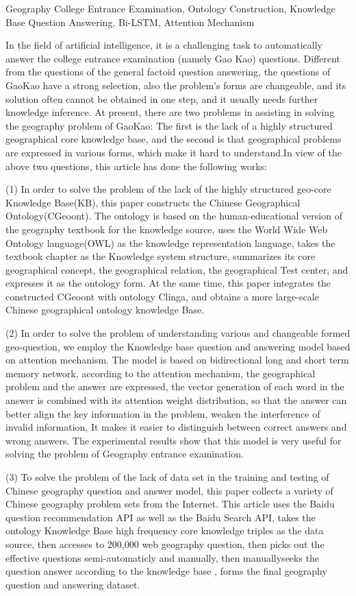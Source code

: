 \begin{englishabstract}{Geography College Entrance Examination, Ontology Construction, Knowledge Base Question Answering, Bi-LSTM, Attention Mechanism}

	In the field of artificial intelligence, it is a challenging task to automatically answer the college entrance examination (namely Gao Kao) questions. Different from the questions of the general factoid question answering, the questions of GaoKao have a strong selection, also the problem's forms are changeable, and its solution often cannot be obtained in one step, and it usually needs further knowledge inference. At present, there are two problems in assisting in solving the geography problem of GaoKao: The first is the lack of a highly structured geographical core knowledge base, and the second is that geographical problems are expressed in various forms, which make it hard to understand.In view of the above two questions, this article has done the following works:
	
(1) In order to solve the problem of the lack of the highly structured geo-core Knowledge Base(KB), this paper constructs the Chinese Geographical Ontology(CGeoont). The ontology is based on the human-educational version of the geography textbook for the knowledge source, uses the World Wide Web Ontology language(OWL) as the knowledge representation language, takes the textbook chapter as the Knowledge system structure, summarizes its core geographical concept, the geographical relation, the geographical Test center, and expresses it as the ontology form. At the same time, this paper integrates the constructed CGeoont with ontology Clinga, and obtains a more large-scale Chinese geographical ontology knowledge Base.
	
(2) In order to solve  the problem of understanding various and changeable formed geo-question, we employ the Knowledge base question and answering model based on attention mechanism. The model is based on bidirectional long and short term memory network, according to the attention mechanism, the geographical problem and the answer are expressed, the vector generation of each word in the answer is combined with its attention weight distribution, so that the answer can better align the key information in the problem, weaken the interference of invalid information, It makes it easier to distinguish between correct answers and wrong answers. The experimental results show that this model is very useful for solving the problem of Geography entrance examination.

(3) To solve the problem of the lack of data set in the training and testing of Chinese geography question and answer model, this paper collects a variety of Chinese geography problem sets from the Internet. This article uses the Baidu question recommendation API as well as the Baidu Search API, takes the ontology Knowledge Base high frequency core knowledge triples as the data source, then accesses to 200,000 web geography question, then picks out the effective questions semi-automaticly and manually, then manuallyseeks the question answer according to the knowledge base , forms the final geography question and answering dataset.

\end{englishabstract}